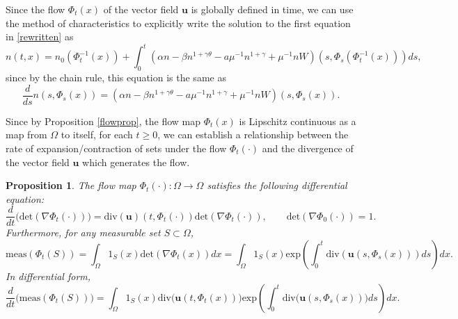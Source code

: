 \documentclass[12pt]{article}
\newcommand{\bd}{\boldsymbol}
\theoremstyle{plain}
\newtheorem{proposition}{Proposition}[section]
\begin{document}
Since the flow $\Phi_{t}(x)$ of the vector field $\bd{u}$ is globally defined in time, we can use the method of characteristics to explicitly write the solution to the first equation in \eqref{rewritten} as
\begin{equation}\label{repformula}
n(t, x) = n_{0}(\Phi^{-1}_{t}(x)) + \int_{0}^{t} (\alpha n - \beta n^{1 + \gamma \theta} - a\mu^{-1} n^{1 + \gamma} + \mu^{-1} nW)(s, \Phi_{s}(\Phi^{-1}_{t}(x))) ds,
\end{equation}
since by the chain rule, this equation is the same as 
\begin{equation*}
\frac{d}{ds}n(s, \Phi_{s}(x)) = (\alpha n - \beta n^{1 + \gamma \theta} - a\mu^{-1} n^{1 + \gamma} + \mu^{-1} nW)(s, \Phi_{s}(x)).
\end{equation*}

Since by Proposition \ref{flowprop}, the flow map $\Phi_{t}(x)$ is Lipschitz continuous as a map from $\Omega$ to itself, for each $t \ge 0$, we can establish a relationship between the rate of expansion/contraction of sets under the flow $\Phi_{t}(\cdot)$ and the divergence of the vector field $\bd{u}$ which generates the flow.

\begin{proposition}\label{divuprop}
The flow map $\Phi_{t}(\cdot): \Omega \to \Omega$ satisfies the following differential equation:
\begin{equation}\label{detode}
\frac{d}{dt}\Big(\text{det}(\nabla \Phi_{t}(\cdot))\Big) = \text{div}(\bd{u})(t, \Phi_{t}(\cdot)) \text{det}(\nabla \Phi_{t}(\cdot)), \qquad \text{det}(\nabla \Phi_{0}(\cdot)) = 1.
\end{equation}
Furthermore, for any measurable set $S \subset \Omega$, 
\begin{equation}\label{measidentity}
\text{meas}(\Phi_{t}(S)) = \int_{\Omega} 1_{S}(x) \text{det}(\nabla \Phi_{t}(x)) dx = \int_{\Omega} 1_{S}(x) \text{exp}\left(\int_{0}^{t} \text{div}(\bd{u}(s, \Phi_{s}(x))) ds\right) dx.
\end{equation}
In differential form,
\begin{equation}\label{measidentityode}
\frac{d}{dt}\Big(\text{meas}(\Phi_{t}(S))\Big) = \int_{\Omega} 1_{S}(x) \text{div}\Big(\bd{u}(t, \Phi_{t}(x))\Big) \text{exp}\left(\int_{0}^{t} \text{div}\Big(\bd{u}(s, \Phi_{s}(x))\Big) ds\right) dx.
\end{equation}
\end{proposition}
\end{document}
